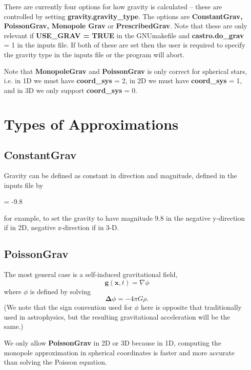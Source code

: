 There are currently four options for how gravity is calculated -- 
these are controlled by setting {\bf gravity.gravity\_type}.  
The options are {\bf ConstantGrav, PoissonGrav, Monopole Grav} or {\bf PrescribedGrav}.
Note that these are only relevant if {\bf USE\_GRAV = TRUE} in the GNUmakefile
and {\bf castro.do\_grav} = 1 in the inputs file.  If both of these are
set then the user is required to specify the gravity type in the inputs file
or the program will abort. 

Note that {\bf MonopoleGrav} and {\bf PoissonGrav} is only correct for 
spherical stars, i.e. in 1D we must have {\bf coord\_sys} = 2, 
in 2D we must have {\bf coord\_sys} = 1, and in 3D we only support {\bf coord\_sys} = 0.

\section{Types of Approximations}

\subsection{ConstantGrav}

Gravity can be defined as constant in direction and magnitude, 
defined in the inputs file by 

 = -9.8

for example, to set the gravity to have magnitude 9.8 in the 
negative y-direction if in 2D, negative z-direction if in 3-D.

\subsection{PoissonGrav}

The most general case is a self-induced gravitational field, 
\begin{equation}
\mathbf{g}(\mathbf{x},t) = \nabla \phi 
\end{equation}
where $\phi$ is defined by solving
\begin{equation}
\mathbf{\Delta} \phi = -4 \pi G \rho .\label{eq:Self Gravity}
\end{equation}
(We note that the sign convention used for $\phi$ here is opposite
that traditionally used in astrophysics, but the resulting
gravitational acceleration will be the same.)

We only allow {\bf PoissonGrav} in 2D or 3D because in 1D, computing the monopole 
approximation in spherical coordinates is faster and more accurate than solving
the Poisson equation.

